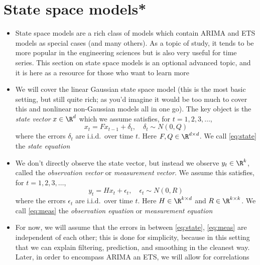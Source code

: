 \documentclass{article}
\begin{document}
\section{State space models*}

\begin{itemize}
\item State space models are a rich class of models which contain ARIMA and ETS
  models as special cases (and many others). As a topic of study, it tends to be
  more popular in the engineering sciences but is also very useful for time
  series. This section on state space models is an optional advanced topic, and
  it is here as a resource for those who want to learn more   

\item We will cover the linear Gaussian state space model (this is the most
  basic setting, but still quite rich; as you'd imagine it would be too much to
  cover this and nonlinear non-Gaussian models all in one go). The key object is
  the \emph{state vector} $x \in \R^d$ which we assume satisfies, for $t =
  1,2,3,\dots$,
  \begin{equation}
  \label{eq:state}
  x_t = F x_{t-1} + \delta_t, \quad \delta_t \sim N(0, Q)
  \end{equation}
  where the errors $\delta_t$ are i.i.d.\ over time $t$. Here $F,Q \in \R^{d
    \times d}$. We call \eqref{eq:state} the \emph{state equation}
  
\item We don't directly observe the state vector, but instead we observe $y_t
  \in \R^k$, called the \emph{observation vector} or \emph{measurement
    vector}. We assume this satisfies, for $t = 1,2,3,\dots$,
  \begin{equation}
  \label{eq:meas}
  y_t = H x_t + \epsilon_t, \quad \epsilon_t \sim N(0, R)
  \end{equation}
  where the errors $\epsilon_t$ are i.i.d.\ over time $t$. Here $H \in \R^{k
    \times d}$ and $R \in \R^{k \times k}$. We call \eqref{eq:meas} the
  \emph{observation equation} or \emph{measurement equation} 

\item For now, we will assume that the errors in between \eqref{eq:state},
  \eqref{eq:meas} are independent of each other; this is done for simplicity,
  because in this setting that we can explain filtering, prediction, and
  smoothing in the cleanest way. Later, in order to encompass ARIMA an ETS, we
  will allow for correlations  


\end{itemize}
\end{document}
